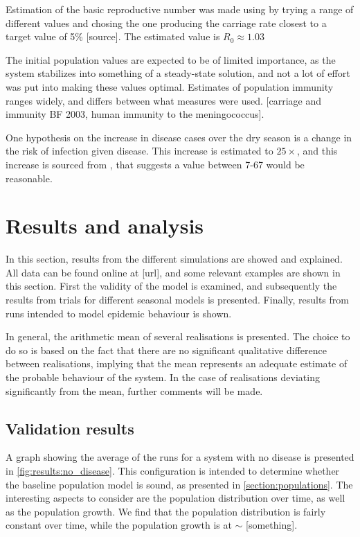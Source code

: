 \documentclass[10pt,a4paper]{article}
\begin{document}
Estimation of the basic reproductive number was made using by trying a range of different values and chosing the one producing the carriage rate closest to a target value of 5\% [source]. The estimated value is $R_0 \approx 1.03$

The initial population values are expected to be of limited importance, as the system stabilizes into something of a steady-state solution, and not a lot of effort was put into making these values optimal. Estimates of population immunity ranges widely, and differs between what measures were used. [carriage and immunity BF 2003, human immunity to the meningococcus].

One hypothesis on the increase in disease cases over the dry season is a change in the risk of infection given disease. This increase is estimated to $25\times$, and this increase is sourced from \cite{mueller2010hypothetical}, that suggests a value between 7-67 would be reasonable.


\section{Results and analysis}

In this section, results from the different simulations are showed and explained. All data can be found online at [url], and some relevant examples are shown in this section. First the validity of the model is examined, and subsequently the results from trials for different seasonal models is presented. Finally, results from runs intended to model epidemic behaviour is shown.

In general, the arithmetic mean of several realisations is presented. The choice to do so is based on the fact that there are no significant qualitative difference between realisations, implying that the mean represents an adequate estimate of the probable behaviour of the system. In the case of realisations deviating significantly from the mean, further comments will be made.

\subsection{Validation results}

A graph showing the average of the runs for a system with no disease is presented in \cref{fig:results:no_disease}. This configuration is intended to determine whether the baseline population model is sound, as presented in \cref{section:populations}. The interesting aspects to consider are the population distribution over time, as well as the population growth. We find that the population distribution is fairly constant over time, while the population growth is at $\sim$ [something].
\end{document}
